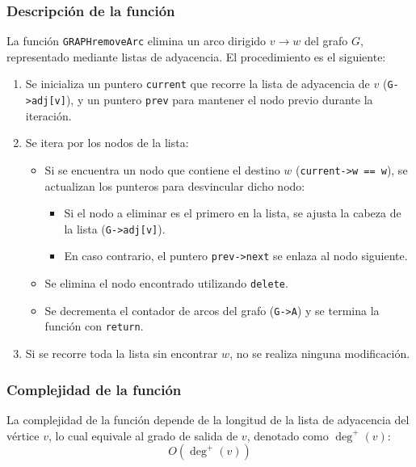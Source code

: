 \documentclass{article}
\begin{document}
        \subsubsection*{Descripción de la función}
            La función \texttt{GRAPHremoveArc} elimina un arco dirigido \( v \to w \) del grafo \( G \), representado mediante listas de adyacencia. El procedimiento es el siguiente:
            \begin{enumerate}
                \item Se inicializa un puntero \texttt{current} que recorre la lista de adyacencia de \( v \) (\texttt{G->adj[v]}), y un puntero \texttt{prev} para mantener el nodo previo durante la iteración.
                \item Se itera por los nodos de la lista:
                \begin{itemize}
                    \item Si se encuentra un nodo que contiene el destino \( w \) (\texttt{current->w == w}), se actualizan los punteros para desvincular dicho nodo:
                    \begin{itemize}
                        \item Si el nodo a eliminar es el primero en la lista, se ajusta la cabeza de la lista (\texttt{G->adj[v]}).
                        \item En caso contrario, el puntero \texttt{prev->next} se enlaza al nodo siguiente.
                    \end{itemize}
                    \item Se elimina el nodo encontrado utilizando \texttt{delete}.
                    \item Se decrementa el contador de arcos del grafo (\texttt{G->A}) y se termina la función con \texttt{return}.
                \end{itemize}
                \item Si se recorre toda la lista sin encontrar \( w \), no se realiza ninguna modificación.
            \end{enumerate}
            
        \subsubsection*{Complejidad de la función}
            La complejidad de la función depende de la longitud de la lista de adyacencia del vértice \( v \), lo cual equivale al grado de salida de \( v \), denotado como \( \deg^+(v) \):
            \[
            O(\deg^+(v))
            \]
            
\end{document}
